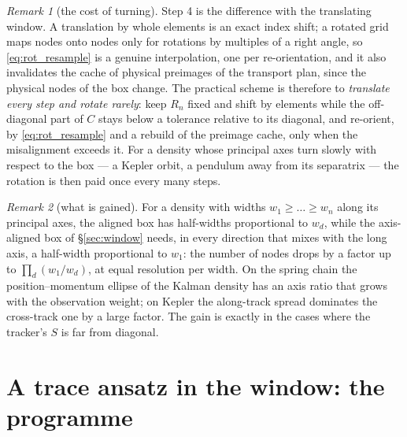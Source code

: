 \documentclass[11pt,a4paper]{article}
\theoremstyle{plain}
\theoremstyle{definition}
\theoremstyle{remark}
\newtheorem{remark}{Remark}
\begin{document}
\begin{remark}[the cost of turning]
Step 4 is the difference with the translating window. A translation by whole elements is an exact index shift; a rotated grid maps nodes onto nodes only for rotations by multiples of a right angle, so \eqref{eq:rot_resample} is a genuine interpolation, one per re-orientation, and it also invalidates the cache of physical preimages of the transport plan, since the physical nodes of the box change. The practical scheme is therefore to \emph{translate every step and rotate rarely}: keep $R_n$ fixed and shift by elements while the off-diagonal part of $C$ stays below a tolerance relative to its diagonal, and re-orient, by \eqref{eq:rot_resample} and a rebuild of the preimage cache, only when the misalignment exceeds it. For a density whose principal axes turn slowly with respect to the box --- a Kepler orbit, a pendulum away from its separatrix --- the rotation is then paid once every many steps.
\end{remark}

\begin{remark}[what is gained]
For a density with widths $w_1\ge\dots\ge w_n$ along its principal axes, the aligned box has half-widths proportional to $w_d$, while the axis-aligned box of \S\ref{sec:window} needs, in every direction that mixes with the long axis, a half-width proportional to $w_1$: the number of nodes drops by a factor up to $\prod_d(w_1/w_d)$, at equal resolution per width. On the spring chain the position--momentum ellipse of the Kalman density has an axis ratio that grows with the observation weight; on Kepler the along-track spread dominates the cross-track one by a large factor. The gain is exactly in the cases where the tracker's $S$ is far from diagonal.
\end{remark}

\section{A trace ansatz in the window: the programme}
\label{sec:trace}
\end{document}
